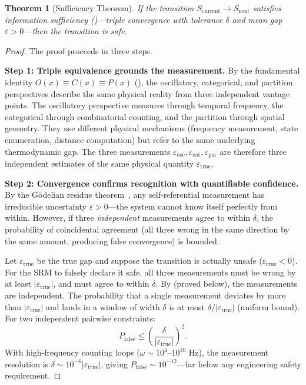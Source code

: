 \documentclass[twocolumn,10pt]{article}
\newtheorem{theorem}{Theorem}[section]
\theoremstyle{definition}
\newcommand{\Scurrent}{S_{\mathrm{current}}}
\newcommand{\Snext}{S_{\mathrm{next}}}
\begin{document}
\begin{theorem}[Sufficiency Theorem]
\label{thm:sufficiency}
If the transition $\Scurrent \to \Snext$ satisfies information sufficiency ()---triple convergence with tolerance $\delta$ and mean gap $\bar{\varepsilon} > 0$---then the transition is safe.
\end{theorem}

\begin{proof}
The proof proceeds in three steps.

\textbf{Step 1: Triple equivalence grounds the measurement.} By the fundamental identity $O(x) \equiv C(x) \equiv P(x)$ (), the oscillatory, categorical, and partition perspectives describe the same physical reality from three independent vantage points. The oscillatory perspective measures through temporal frequency, the categorical through combinatorial counting, and the partition through spatial geometry. They use different physical mechanisms (frequency measurement, state enumeration, distance computation) but refer to the same underlying thermodynamic gap. The three measurements $\varepsilon_{\mathrm{osc}}, \varepsilon_{\mathrm{cat}}, \varepsilon_{\mathrm{par}}$ are therefore three independent estimates of the same physical quantity $\varepsilon_{\mathrm{true}}$.

\textbf{Step 2: Convergence confirms recognition with quantifiable confidence.} By the G\"{o}delian residue theorem~\cite{godel1931,sachikonye2026trajectory}, any self-referential measurement has irreducible uncertainty $\varepsilon > 0$---the system cannot know itself perfectly from within. However, if three \emph{independent} measurements agree to within $\delta$, the probability of coincidental agreement (all three wrong in the same direction by the same amount, producing false convergence) is bounded.

Let $\varepsilon_{\mathrm{true}}$ be the true gap and suppose the transition is actually unsafe ($\varepsilon_{\mathrm{true}} < 0$). For the SRM to falsely declare it safe, all three measurements must be wrong by at least $|\varepsilon_{\mathrm{true}}|$, and must agree to within $\delta$. By  (proved below), the measurements are independent. The probability that a single measurement deviates by more than $|\varepsilon_{\mathrm{true}}|$ and lands in a window of width $\delta$ is at most $\delta / |\varepsilon_{\mathrm{true}}|$ (uniform bound). For two independent pairwise constraints:
\begin{equation}
P_{\mathrm{false}} \leq \left(\frac{\delta}{|\varepsilon_{\mathrm{true}}|}\right)^2.
\end{equation}
With high-frequency counting loops ($\omega \sim 10^4$--$10^{10}$ Hz), the measurement resolution is $\delta \sim 10^{-6}|\varepsilon_{\mathrm{true}}|$, giving $P_{\mathrm{false}} \sim 10^{-12}$---far below any engineering safety requirement.


\end{proof}
\end{document}
